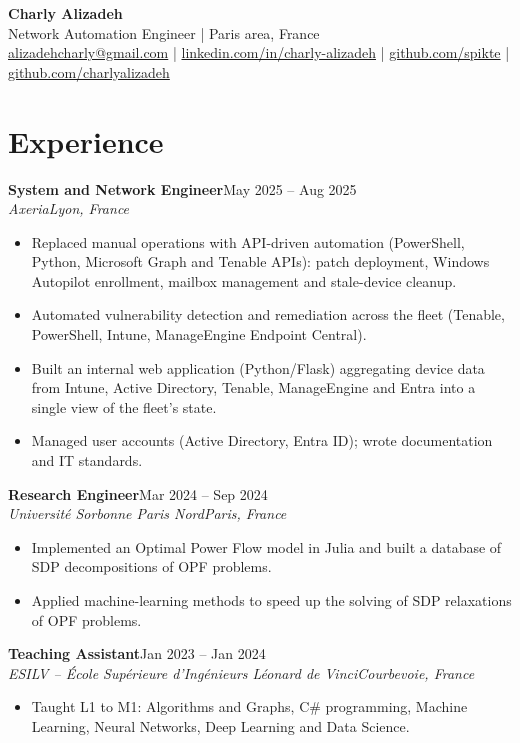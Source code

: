 \documentclass[9pt,a4paper]{extarticle}
\newcommand{\entry}[4]{%
  \textbf{#1}\hfill #2\\[-0.1em]
  \textit{#3}\hfill \textit{#4}\par\vspace{0.1em}}
\begin{document}
\begin{center}
  {\LARGE\bfseries Charly Alizadeh}\\[0.3em]
  Network Automation Engineer \;|\; Paris area, France\\[0.2em]
  \href{mailto:alizadehcharly@gmail.com}{alizadehcharly@gmail.com} \;|\;
  \href{https://www.linkedin.com/in/charly-alizadeh}{linkedin.com/in/charly-alizadeh} \;|\;
  \href{https://github.com/spikte}{github.com/spikte} \;|\;
  \href{https://github.com/charlyalizadeh}{github.com/charlyalizadeh}
\end{center}

\section{Experience}

\entry{System and Network Engineer}{May 2025 -- Aug 2025}{Axeria}{Lyon, France}
\begin{itemize}
  \item Replaced manual operations with API-driven automation (PowerShell, Python, Microsoft Graph and Tenable APIs): patch deployment, Windows Autopilot enrollment, mailbox management and stale-device cleanup.
  \item Automated vulnerability detection and remediation across the fleet (Tenable, PowerShell, Intune, ManageEngine Endpoint Central).
  \item Built an internal web application (Python/Flask) aggregating device data from Intune, Active Directory, Tenable, ManageEngine and Entra into a single view of the fleet's state.
  \item Managed user accounts (Active Directory, Entra ID); wrote documentation and IT standards.
\end{itemize}

\entry{Research Engineer}{Mar 2024 -- Sep 2024}{Universit\'e Sorbonne Paris Nord}{Paris, France}
\begin{itemize}
  \item Implemented an Optimal Power Flow model in Julia and built a database of SDP decompositions of OPF problems.
  \item Applied machine-learning methods to speed up the solving of SDP relaxations of OPF problems.
\end{itemize}

\entry{Teaching Assistant}{Jan 2023 -- Jan 2024}{ESILV -- \'Ecole Sup\'erieure d'Ing\'enieurs L\'eonard de Vinci}{Courbevoie, France}
\begin{itemize}
  \item Taught L1 to M1: Algorithms and Graphs, C\# programming, Machine Learning, Neural Networks, Deep Learning and Data Science.
\end{itemize}
\end{document}
